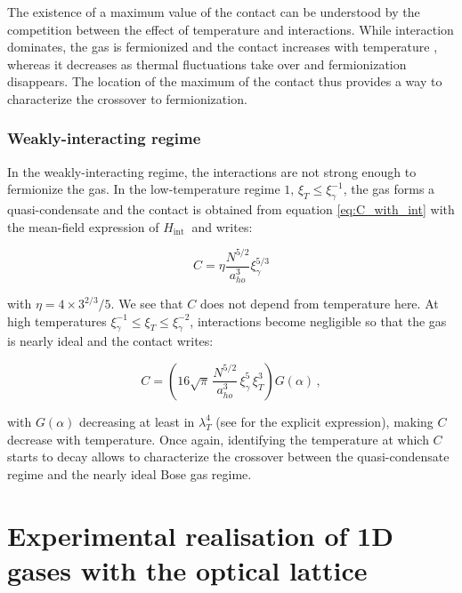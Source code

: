 The existence of a maximum value of the contact can be understood by the competition between the effect of temperature and interactions. While interaction dominates, the gas is fermionized and the contact increases with temperature \cite{vignolo2013universal}, whereas it decreases as thermal fluctuations take over and fermionization disappears. The location of the maximum of the contact thus provides a way to characterize the crossover to fermionization. 

\subsubsection{Weakly-interacting regime}

In the weakly-interacting regime, the interactions are not strong enough to fermionize the gas. In the low-temperature regime $1, \, \xi_T \leq \xi_\gamma^{-1}$, the gas forms a quasi-condensate and the contact is obtained from equation \ref{eq:C_with_int} with the mean-field expression of $H_{\text {int }}$ and writes:

\begin{equation}
    C = \eta \frac{N^{5/2}}{a_{ho}^3} \xi_\gamma^{5/3} 
    \label{eq:weak_int_lowT}
\end{equation}

\noindent with $\eta = 4 \times 3^{2/3}/5$. We see that $C$ does not depend from temperature here. At high temperatures $\xi_\gamma^{-1} \leq \xi_T \leq \xi_\gamma^{-2}$, interactions become negligible so that the gas is nearly ideal and the contact writes:

\begin{equation}
    C = \left( 16 \sqrt{\pi} \, \frac{N^{5/2}}{a_{ho}^3} \, \xi_\gamma^5 \, \xi_T^3 \right) G(\alpha) \, ,
    \label{eq:weak_int_highT}
\end{equation}

\noindent with $G(\alpha)$ decreasing at least in $\lambda_T^4$ (see \cite{yao2018tan} for the explicit expression), making $C$ decrease with temperature. Once again, identifying the temperature at which $C$ starts to decay allows to characterize the crossover between the quasi-condensate regime and the nearly ideal Bose gas regime.

\section{Experimental realisation of 1D gases with the optical lattice}

\label{sec:1D_exp}

